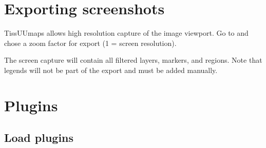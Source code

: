 \documentclass[letterpaper,10pt,english,openany,oneside]{sphinxmanual}
\begin{document}
\begin{sphinxVerbatim}[commandchars=\\\{\}]
\PYG{p}{],}
\PYG{p}{[}
\PYG{p}{],}
\end{sphinxVerbatim}

\sphinxstepscope


\section{Exporting screenshots}
\label{\detokenize{docs/starting/capture:exporting-screenshots}}\label{\detokenize{docs/starting/capture::doc}}
\sphinxAtStartPar
TissUUmaps allows high resolution capture of the image viewport. Go to  and chose a zoom factor for export (1 = screen resolution).

\sphinxAtStartPar
The screen capture will contain all filtered layers, markers, and regions. Note that legends will not be part of the export and must be added manually.

\sphinxstepscope


\section{Plugins}
\label{\detokenize{docs/starting/plugins:plugins}}\label{\detokenize{docs/starting/plugins::doc}}

\subsection{Load plugins}
\label{\detokenize{docs/starting/plugins:load-plugins}}
\end{document}
